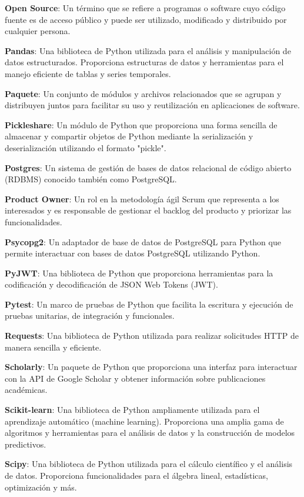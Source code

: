 \textbf{Open Source}: Un término que se refiere a programas o software cuyo código fuente es de acceso público y puede ser utilizado, modificado y distribuido por cualquier persona.

\textbf{Pandas}: Una biblioteca de Python utilizada para el análisis y manipulación de datos estructurados. Proporciona estructuras de datos y herramientas para el manejo eficiente de tablas y series temporales.

\textbf{Paquete}: Un conjunto de módulos y archivos relacionados que se agrupan y distribuyen juntos para facilitar su uso y reutilización en aplicaciones de software.

\textbf{Pickleshare}: Un módulo de Python que proporciona una forma sencilla de almacenar y compartir objetos de Python mediante la serialización y deserialización utilizando el formato "pickle".

\textbf{Postgres}: Un sistema de gestión de bases de datos relacional de código abierto (RDBMS) conocido también como PostgreSQL.

\textbf{Product Owner}: Un rol en la metodología ágil Scrum que representa a los interesados y es responsable de gestionar el backlog del producto y priorizar las funcionalidades.

\textbf{Psycopg2}: Un adaptador de base de datos de PostgreSQL para Python que permite interactuar con bases de datos PostgreSQL utilizando Python.

\textbf{PyJWT}: Una biblioteca de Python que proporciona herramientas para la codificación y decodificación de JSON Web Tokens (JWT).

\textbf{Pytest}: Un marco de pruebas de Python que facilita la escritura y ejecución de pruebas unitarias, de integración y funcionales.

\textbf{Requests}: Una biblioteca de Python utilizada para realizar solicitudes HTTP de manera sencilla y eficiente.

\textbf{Scholarly}: Un paquete de Python que proporciona una interfaz para interactuar con la API de Google Scholar y obtener información sobre publicaciones académicas.

\textbf{Scikit-learn}: Una biblioteca de Python ampliamente utilizada para el aprendizaje automático (machine learning). Proporciona una amplia gama de algoritmos y herramientas para el análisis de datos y la construcción de modelos predictivos.

\textbf{Scipy}: Una biblioteca de Python utilizada para el cálculo científico y el análisis de datos. Proporciona funcionalidades para el álgebra lineal, estadísticas, optimización y más.

